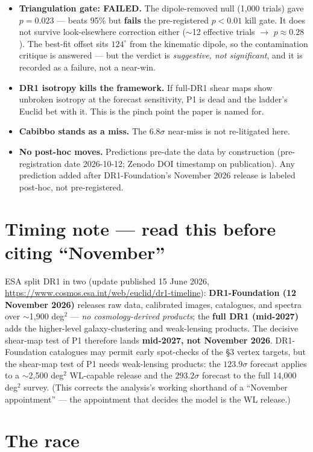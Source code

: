 \documentclass{alienfolio}
\begin{document}
\begin{itemize}
\item \textbf{Triangulation gate: FAILED.} The dipole-removed null
(1,000 trials) gave $p = 0.023$ --- beats 95\% but \textbf{fails} the
pre-registered $p < 0.01$ kill gate. It does not survive look-elsewhere
correction either ($\sim$12 effective trials $\to$ $p \approx 0.28$).
The best-fit offset sits $124^\circ$ from the kinematic dipole, so the
contamination critique is answered --- but the verdict is
\emph{suggestive, not significant}, and it is recorded as a failure, not
a near-win.
\item \textbf{DR1 isotropy kills the framework.} If full-DR1 shear maps
show unbroken isotropy at the forecast sensitivity, P1 is dead and the
ladder's Euclid bet with it. This is the pinch point the paper is named
for.
\item \textbf{Cabibbo stands as a miss.} The $6.8\sigma$ near-miss is
not re-litigated here.
\item \textbf{No post-hoc moves.} Predictions pre-date the data by
construction (pre-registration date 2026-10-12; Zenodo DOI timestamp on
publication). Any prediction added after DR1-Foundation's November 2026
release is labeled post-hoc, not pre-registered.
\end{itemize}

\section{Timing note --- read this before citing ``November''}
\label{sec:timing}

ESA split DR1 in two (update published 15 June 2026,
\url{https://www.cosmos.esa.int/web/euclid/dr1-timeline}):
\textbf{DR1-Foundation (12 November 2026)} releases raw data,
calibrated images, catalogues, and spectra over $\sim$1,900 deg$^2$ ---
\emph{no cosmology-derived products}; the \textbf{full DR1 (mid-2027)}
adds the higher-level galaxy-clustering and weak-lensing products. The
decisive shear-map test of P1 therefore lands \textbf{mid-2027, not
November 2026}. DR1-Foundation catalogues may permit early spot-checks
of the \S3 vertex targets, but the shear-map test of P1 needs
weak-lensing products: the $123.9\sigma$ forecast applies to a $\sim$2,500
deg$^2$ WL-capable release and the $293.2\sigma$ forecast to the full
14,000 deg$^2$ survey. (This corrects the analysis's working shorthand of a
``November appointment'' --- the appointment that decides the model is
the WL release.)

\section{The race}
\label{sec:race}
\end{document}
